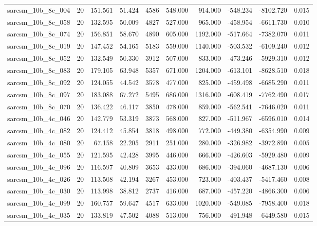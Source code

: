 \begin{tabular}{lrrrrrrrrr}
sarcsm\_10b\_8c\_004 & 20 & 151.561 & 51.424 & 4586 & 548.000 & 914.000 & -548.234 & -8102.720 & 0.015 \\
sarcsm\_10b\_8c\_058 & 20 & 132.595 & 50.009 & 4827 & 527.000 & 965.000 & -458.954 & -6611.730 & 0.010 \\
sarcsm\_10b\_8c\_074 & 20 & 156.851 & 58.670 & 4890 & 605.000 & 1192.000 & -517.664 & -7382.070 & 0.011 \\
sarcsm\_10b\_8c\_019 & 20 & 147.452 & 54.165 & 5183 & 559.000 & 1140.000 & -503.532 & -6109.240 & 0.012 \\
sarcsm\_10b\_8c\_052 & 20 & 132.549 & 50.330 & 3912 & 507.000 & 833.000 & -473.246 & -5929.310 & 0.012 \\
sarcsm\_10b\_8c\_083 & 20 & 179.105 & 63.948 & 5357 & 671.000 & 1204.000 & -613.101 & -8628.510 & 0.018 \\
sarcsm\_10b\_8c\_092 & 20 & 124.055 & 44.542 & 3578 & 477.000 & 825.000 & -459.498 & -6685.290 & 0.011 \\
sarcsm\_10b\_8c\_097 & 20 & 183.088 & 67.272 & 5495 & 686.000 & 1316.000 & -608.419 & -7762.490 & 0.017 \\
sarcsm\_10b\_8c\_070 & 20 & 136.422 & 46.117 & 3850 & 478.000 & 859.000 & -562.541 & -7646.020 & 0.011 \\
sarcsm\_10b\_4c\_046 & 20 & 142.779 & 53.319 & 3873 & 568.000 & 827.000 & -511.967 & -6596.010 & 0.014 \\
sarcsm\_10b\_4c\_082 & 20 & 124.412 & 45.854 & 3818 & 498.000 & 772.000 & -449.380 & -6354.990 & 0.009 \\
sarcsm\_10b\_4c\_080 & 20 & 67.158 & 22.205 & 2911 & 251.000 & 280.000 & -326.982 & -3972.890 & 0.005 \\
sarcsm\_10b\_4c\_055 & 20 & 121.595 & 42.428 & 3995 & 446.000 & 666.000 & -426.603 & -5929.480 & 0.009 \\
sarcsm\_10b\_4c\_096 & 20 & 116.597 & 40.809 & 3653 & 433.000 & 686.000 & -394.060 & -4687.130 & 0.006 \\
sarcsm\_10b\_4c\_026 & 20 & 113.508 & 42.194 & 3267 & 453.000 & 723.000 & -403.437 & -5417.460 & 0.008 \\
sarcsm\_10b\_4c\_030 & 20 & 113.998 & 38.812 & 2737 & 416.000 & 687.000 & -457.220 & -4866.300 & 0.006 \\
sarcsm\_10b\_4c\_099 & 20 & 160.757 & 59.647 & 4517 & 633.000 & 1020.000 & -549.085 & -7958.400 & 0.018 \\
sarcsm\_10b\_4c\_035 & 20 & 133.819 & 47.502 & 4088 & 513.000 & 756.000 & -491.948 & -6449.580 & 0.015 \\

\end{tabular}
